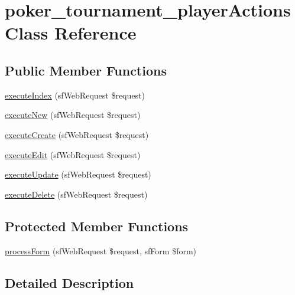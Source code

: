 \hypertarget{classpoker__tournament__player_actions}{\section{poker\-\_\-tournament\-\_\-player\-Actions Class Reference}
\label{classpoker__tournament__player_actions}
}
\subsection*{Public Member Functions}
\begin{DoxyCompactItemize}
\item 
\hyperlink{classpoker__tournament__player_actions_a948cc911eb1d9f77990be54af3b2080f}{execute\-Index} (sf\-Web\-Request \$request)
\item 
\hyperlink{classpoker__tournament__player_actions_a0ffbea56560c6c633dae68ec22aff21c}{execute\-New} (sf\-Web\-Request \$request)
\item 
\hyperlink{classpoker__tournament__player_actions_a75837617743fb64dca82d8133b2c662a}{execute\-Create} (sf\-Web\-Request \$request)
\item 
\hyperlink{classpoker__tournament__player_actions_af4d8fedd4b28f3398826a1bb8fa54394}{execute\-Edit} (sf\-Web\-Request \$request)
\item 
\hyperlink{classpoker__tournament__player_actions_af7b4f51862add3c2ebb54efc136a0840}{execute\-Update} (sf\-Web\-Request \$request)
\item 
\hyperlink{classpoker__tournament__player_actions_a52b5b11b11a0070dd2662257520c045a}{execute\-Delete} (sf\-Web\-Request \$request)
\end{DoxyCompactItemize}
\subsection*{Protected Member Functions}
\begin{DoxyCompactItemize}
\item 
\hyperlink{classpoker__tournament__player_actions_a7cf661d837626e0320753cbffa019a01}{process\-Form} (sf\-Web\-Request \$request, sf\-Form \$form)
\end{DoxyCompactItemize}


\subsection{Detailed Description}


